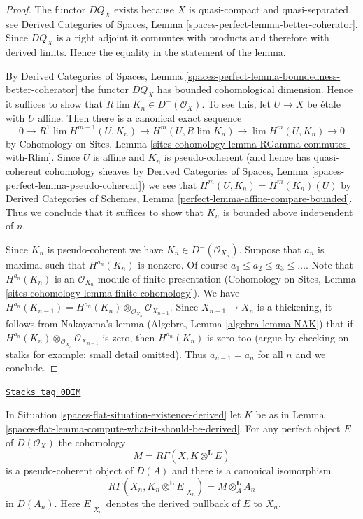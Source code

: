 \begin{proof}
The functor $DQ_X$ exists because $X$ is quasi-compact and
quasi-separated, see Derived Categories of Spaces, Lemma
\ref{spaces-perfect-lemma-better-coherator}.
Since $DQ_X$ is a right adjoint it commutes with products
and therefore with derived limits. Hence the equality
in the statement of the lemma.

\medskip\noindent
By Derived Categories of Spaces,
Lemma \ref{spaces-perfect-lemma-boundedness-better-coherator}
the functor $DQ_X$ has bounded cohomological dimension.
Hence it suffices to show that $R\lim K_n \in D^-(\mathcal{O}_X)$.
To see this, let $U \to X$ be \'etale with $U$ affine.
Then there is a canonical exact sequence
$$
0 \to
R^1\lim H^{m - 1}(U, K_n) \to H^m(U, R\lim K_n) \to
\lim H^m(U, K_n) \to 0
$$
by Cohomology on Sites, Lemma
\ref{sites-cohomology-lemma-RGamma-commutes-with-Rlim}.
Since $U$ is affine and $K_n$ is pseudo-coherent (and hence has
quasi-coherent cohomology sheaves by
Derived Categories of Spaces, Lemma \ref{spaces-perfect-lemma-pseudo-coherent})
we see that $H^m(U, K_n) = H^m(K_n)(U)$ by
Derived Categories of Schemes, Lemma \ref{perfect-lemma-affine-compare-bounded}.
Thus we conclude that it suffices to show that $K_n$
is bounded above independent of $n$.

\medskip\noindent
Since $K_n$ is pseudo-coherent we have $K_n \in D^-(\mathcal{O}_{X_n})$.
Suppose that $a_n$ is maximal such that $H^{a_n}(K_n)$ is nonzero.
Of course $a_1 \leq a_2 \leq a_3 \leq \ldots$.
Note that $H^{a_n}(K_n)$ is an
$\mathcal{O}_{X_n}$-module of finite presentation
(Cohomology on Sites, Lemma
\ref{sites-cohomology-lemma-finite-cohomology}).
We have $H^{a_n}(K_{n - 1}) =
H^{a_n}(K_n) \otimes_{\mathcal{O}_{X_n}} \mathcal{O}_{X_{n - 1}}$.
Since $X_{n - 1} \to X_n$ is a thickening, it follows from
Nakayama's lemma (Algebra, Lemma \ref{algebra-lemma-NAK}) that if
$H^{a_n}(K_n) \otimes_{\mathcal{O}_{X_n}} \mathcal{O}_{X_{n - 1}}$
is zero, then $H^{a_n}(K_n)$ is zero too (argue by checking on stalks
for example; small detail omitted).
Thus $a_{n - 1} = a_n$ for all $n$ and we conclude.
\end{proof}

\begin{lemma}
\label{spaces-flat-lemma-compute-against-perfect-derived}
\href{https://stacks.math.columbia.edu/tag/0DIM}{\texttt{Stacks tag 0DIM}}

In Situation \ref{spaces-flat-situation-existence-derived} let $K$ be as in
Lemma \ref{spaces-flat-lemma-compute-what-it-should-be-derived}. For any perfect
object $E$ of $D(\mathcal{O}_X)$ the cohomology
$$
M = R\Gamma(X, K \otimes^\mathbf{L} E)
$$
is a pseudo-coherent object of $D(A)$ and there is a canonical isomorphism
$$
R\Gamma(X_n, K_n \otimes^\mathbf{L} E|_{X_n}) = M \otimes_A^\mathbf{L} A_n
$$
in $D(A_n)$. Here $E|_{X_n}$ denotes the derived pullback of $E$ to $X_n$.
\end{lemma}

